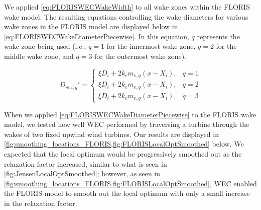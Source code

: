 \documentclass[a4paper]{jpconf}
\begin{document}

We applied \cref{eq:FLORISWECWakeWidth} to all wake zones within the FLORIS wake model. The resulting equations controlling the wake diameters for various wake zones in the FLORIS model are displayed below in \cref{eq:FLORISWECWakeDiameterPiecewise}. In this equation, $q$ represents the wake zone being used (i.e., $q = 1$ for the innermost wake zone, $q = 2$ for the middle wake zone, and $q = 3$ for the outermost wake zone).

\begin{equation}
    D_{w, i, q}' = \begin{cases}
        \xi D_i + 2k_em_{e, q} (x - X_i), & q = 1 \\
        \xi D_i + 2k_em_{e, q} (x - X_i), & q = 2 \\
        \xi D_i + 2k_em_{e, q} (x - X_i), & q = 3
    \end{cases}
    \label{eq:FLORISWECWakeDiameterPiecewise}
\end{equation}

When we applied \cref{eq:FLORISWECWakeDiameterPiecewise} to the FLORIS wake model, we tested how well WEC performed by traversing a turbine through the wakes of two fixed upwind wind turbines. Our results are displayed in \cref{fig:smoothing_locations_FLORIS,fig:FLORISLocalOptSmoothed} below. We expected that the local optimum would be progressively smoothed out as the relaxation factor increased, similar to what is seen in \cref{fig:JensenLocalOptSmoothed}; however, as seen in \cref{fig:smoothing_locations_FLORIS,fig:FLORISLocalOptSmoothed}, WEC enabled the FLORIS model to smooth out the local optimum with only a small increase in the relaxation factor.
\end{document}
